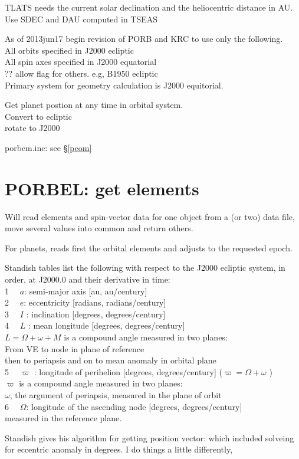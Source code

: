 \documentclass[draft]{article}
\newcommand{\qi}{\\ \hspace*{2.em}}      %
\newcommand{\qii}{\\ \hspace*{4.em}}     %
\newcommand{\qiii}{\\ \hspace*{6.em}}    %
\begin{document}
TLATS needs the current solar declination and the heliocentric distance in AU.
\qi Use SDEC and DAU computed in TSEAS 

As of 2013jun17 begin revision of PORB and KRC to use only the following.
\qi All orbits specified in J2000 ecliptic
\qi All spin axes specified in J2000 equatorial
\qii ?? allow flag for others. e.g, B1950 ecliptic
\qi Primary system for geometry calculation is J2000 equitorial.

Get planet postion at any time in orbital system.
\qi Convert to ecliptic
\qi rotate to J2000 

porbcm.inc: see \S \ref{pcom}

\section{PORBEL: get elements} %
Will read elements and spin-vector data for one object from a (or two) data file, move several values into common and return others.

For planets, reads first the orbital elements and adjusts to the requested epoch. 

Standish tables list the following with respect to the J2000 ecliptic system, in order, at J2000.0 and their derivative in time:
\qi 1 \ \ $a$: semi-major axis [au, au/century]
\qi 2 \ \ $e$: eccentricity [radians, radians/century]
\qi 3 \ \ $I$ : inclination [degrees, degrees/century]
\qi 4 \ \ $L$ : mean longitude [degrees, degrees/century]
\qii   $L=\Omega +\omega + M$  is a compound angle measured in two planes: 
\qiii From VE to node in plane of reference
\qiii then to periapsis and on to mean anomaly in orbital plane
\qi 5 \ \ $\varpi$ : longitude of perihelion [degrees, degrees/century] ($\varpi= \Omega+ \omega    $ ) 
\qii   $\varpi$ is a compound angle measured in two planes:
\qiii $\omega$, the argument of periapsis, measured in the plane of orbit 
\qi 6 \ \ $\Omega$:  longitude of the ascending node [degrees, degrees/century]
\qii  measured in the reference plane.


Standish gives his algorithm for getting position vector: which included solveing for eccentric anomaly in degrees. I do things a little differently, 
\end{document}
